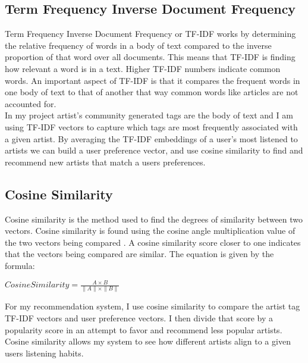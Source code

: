 \documentclass[10pt,twocolumn]{article}
\begin{document}
\subsection{Term Frequency Inverse Document Frequency}
Term Frequency Inverse Document Frequency or TF-IDF works by determining the relative frequency of words in a body of text compared to the inverse proportion of that word over all documents\cite{TFIDF}. This means that TF-IDF is finding how relevant a word is in a text. Higher TF-IDF numbers indicate common words. An important aspect of TF-IDF is that it compares the frequent words in one body of text to that of another that way common words like articles are not accounted for.\\

\indent In my project artist's community generated tags are the body of text and I am using TF-IDF vectors to capture which tags are most frequently associated with a given artist. By averaging the TF-IDF embeddings of a user's most listened to artists we can build a user preference vector, and use cosine similarity to find and recommend new artists that match a users preferences. 

\subsection{Cosine Similarity}
Cosine similarity is the method used to find the degrees of similarity between two vectors. Cosine similarity is found using the cosine angle multiplication value of the two vectors being compared \cite{Cosine}. A cosine similarity score closer to one indicates that the vectors being compared are similar. The equation is given by the formula:
\begin{center}
\begin{math}
   Cosine Similarity = \frac{ A \times B }{\|A\| \times \|B\|}
\end{math}
\end{center}
For my recommendation system, I use cosine similarity to compare the artist tag TF-IDF vectors and user preference vectors. I then divide that score by a popularity score in an attempt to favor and recommend less popular artists. Cosine similarity allows my system to see how different artists align to a given users listening habits.  
\end{document}
